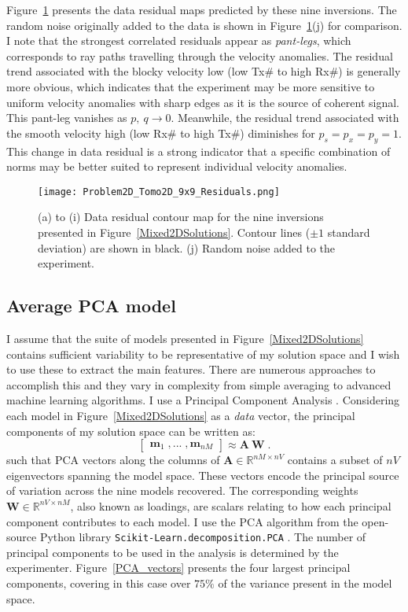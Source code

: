Figure~\ref{Mixed2DResiduals} presents the data residual maps predicted by these nine inversions. The random noise originally added to the data is shown in Figure~\ref{Mixed2DResiduals}(j) for comparison. I note that the strongest correlated residuals appear as \emph{pant-legs}, which corresponds to ray paths travelling through the velocity anomalies. The residual trend associated with the blocky velocity low (low Tx\# to high Rx\#) is generally more obvious, which indicates that the experiment may be more sensitive to uniform velocity anomalies with sharp edges as it is the source of coherent signal. This pant-leg vanishes as $p,\:q\rightarrow 0$. Meanwhile, the residual trend associated with the smooth velocity high (low Rx\# to high Tx\#) diminishes for $p_s=p_x=p_y=1$. This change in data residual is a strong indicator that a specific combination of norms may be better suited to represent individual velocity anomalies.
\begin{figure}
\texttt{[image: Problem2D\_Tomo2D\_9x9\_Residuals.png]}
\caption{(a) to (i) Data residual contour map for the nine inversions presented in Figure~\ref{Mixed2DSolutions}. Contour lines ($\pm 1$ standard deviation) are shown in black. (j) Random noise added to the experiment.}
\label{Mixed2DResiduals}
\end{figure}


\subsection{Average PCA model}\label{PCAmodel}
I assume that the suite of models presented in Figure~\ref{Mixed2DSolutions} contains sufficient variability to be representative of my solution space and I wish to use these to extract the main features. There are numerous approaches to accomplish this and they vary in complexity from simple averaging to advanced machine learning algorithms.
I use a Principal Component Analysis \cite[]{Pearson1901, Hotelling1933}.
Considering each model in Figure~\ref{Mixed2DSolutions} as a \emph{data} vector, the principal components of my solution space can be written as:
\begin{equation}
\begin{bmatrix}
\mathbf{m}_1\;, ...\;, \mathbf{m}_{nM}
\end{bmatrix} \approx
\mathbf{A\:W}\;.
\end{equation}
such that PCA vectors along the columns of $\mathbf{A} \in \mathbb{R}^{nM \times nV}$ contains a subset of $nV$ eigenvectors spanning the model space. These vectors encode the principal source of variation across the nine models recovered.
The corresponding weights $\mathbf{W} \in \mathbb{R}^{nV \times nM}$, also known as loadings, are scalars relating to how each principal component contributes to each model. I use the PCA algorithm from the open-source Python library \texttt{Scikit-Learn.decomposition.PCA} \cite[]{Pedregosa2011}. The number of principal components to be used in the analysis is determined by the experimenter.
Figure~\ref{PCA_vectors} presents the four largest principal components, covering in this case over $75\%$ of the variance present in the model space.

